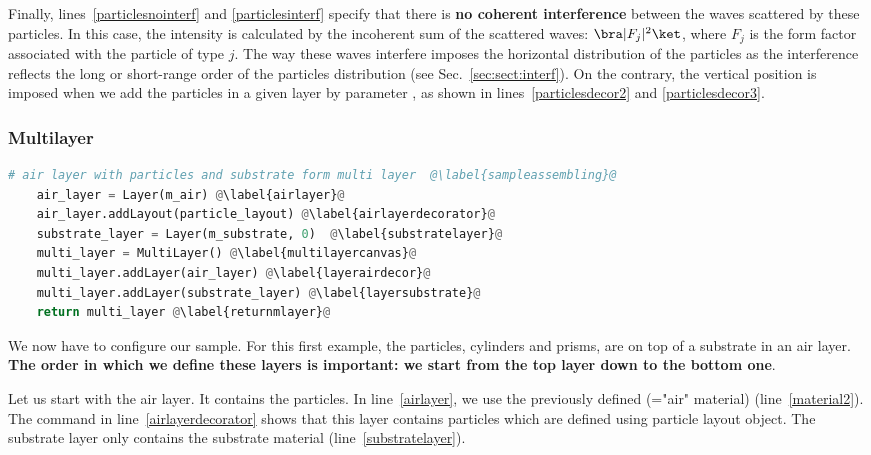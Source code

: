 \noindent Finally, lines~\ref{particlesnointerf} and
\ref{particlesinterf} specify that there is \textbf{no coherent interference} between
the waves scattered by these particles. In this case, the intensity is calculated by
the incoherent sum of the scattered waves: $\bra |F_j|^2\ket$,
where $F_j$ is the form factor associated with the particle of type $j$.  The way these waves
interfere imposes the horizontal distribution of
the particles as
the interference reflects the long or short-range order of the
particles distribution (see  Sec.~\ref{sec:sect:interf}). On the contrary, the vertical position is
imposed when we add the particles in a given layer by parameter , as shown in lines~\ref{particlesdecor2} and \ref{particlesdecor3}.

\subsubsection{Multilayer}
\begin{lstlisting}[language=python, style=eclipseboxed,name=ex1,nolol]
# air layer with particles and substrate form multi layer  @\label{sampleassembling}@
    air_layer = Layer(m_air) @\label{airlayer}@
    air_layer.addLayout(particle_layout) @\label{airlayerdecorator}@
    substrate_layer = Layer(m_substrate, 0)  @\label{substratelayer}@
    multi_layer = MultiLayer() @\label{multilayercanvas}@
    multi_layer.addLayer(air_layer) @\label{layerairdecor}@
    multi_layer.addLayer(substrate_layer) @\label{layersubstrate}@
    return multi_layer @\label{returnmlayer}@
\end{lstlisting}
We now have to configure our sample. For this first example,
the particles, \idest  cylinders and prisms, are on top of a substrate in an
air layer. \textbf{The order in which we define these layers is important: we
start from the top layer down to the bottom one}.

Let us start with the air layer. It contains the particles. In
line~\ref{airlayer}, we use the previously defined 
(="air" material) (line~\ref{material2}). The command in line~\ref{airlayerdecorator} shows that this layer contains particles
which are defined using particle layout object. The substrate layer
only contains the substrate material (line~\ref{substratelayer}).


